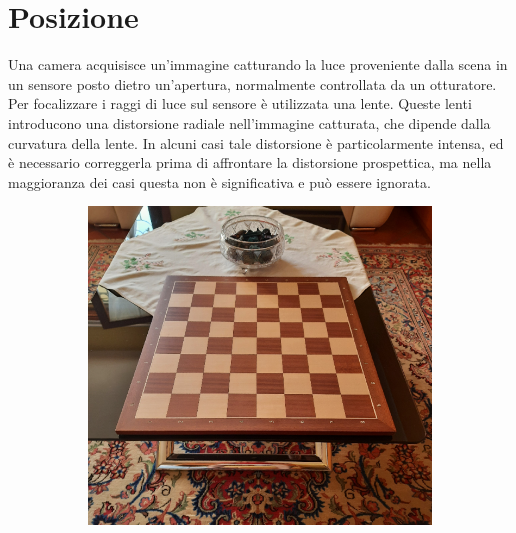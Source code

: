 \chapter{Posizione}
\label{sec:posizione}

Una camera acquisisce un'immagine catturando la luce proveniente dalla scena in un sensore posto dietro un'apertura, normalmente controllata da un otturatore.
Per focalizzare i raggi di luce sul sensore è utilizzata una lente.
Queste lenti introducono una distorsione radiale nell'immagine catturata, che dipende dalla curvatura della lente.
In alcuni casi tale distorsione è particolarmente intensa, ed è necessario correggerla prima di affrontare la distorsione prospettica, ma nella maggioranza dei casi questa non è significativa e può essere ignorata.

\begin{figure}
    \centering
    \begin{subfigure}{.49\textwidth}
        \includegraphics[width=\textwidth]{images/persp1.png}
    \end{subfigure}
    \hfill
    \begin{subfigure}{.49\textwidth}

\end{subfigure}
\end{figure}
